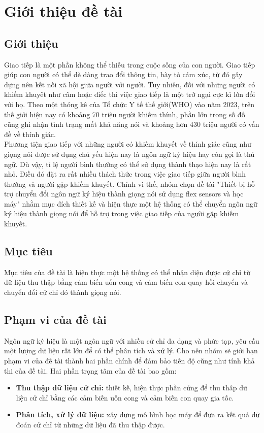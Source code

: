 \section{Giới thiệu đề tài}
\subsection{Giới thiệu}
\indent Giao tiếp là một phần không thể thiếu trong cuộc sống của con người. Giao tiếp giúp con người có thể dẽ dàng trao đổi thông tin, bày tỏ cảm xúc, từ đó gây dựng nên kết nối xã hội giữa người với người. Tuy nhiên, đối với những người có khiếm khuyêt như câm hoặc điếc thì việc giao tiếp là một trở ngại cực kì lớn đối với họ. Theo một thóng kê của Tổ chức Y tế thế giới(WHO) vào năm 2023, trên thế giới hiện nay có khoảng 70 triệu người khiếm thính, phần lớn trong số đố cũng ghi nhận tình trạng mất khả năng nói và khoảng hơn 430 triệu người có vấn đề về thính giác.\\
\indent Phương tiện giao tiếp với những người có khiếm khuyết về thính giác cũng như giọng nói được sử dụng chủ yếu hiện nay là ngôn ngữ ký hiệu hay còn gọi là thủ ngữ. Dù vậy, tỉ lệ người bình thường có thể sử dụng thành thạo hiện nay là rất nhỏ. Điều đó đặt ra rất nhiều thách thức trong việc giao tiếp giữa người bình thường và người gặp khiếm khuyết. Chính vì thế, nhóm chọn đề tài "Thiết bị hỗ trợ chuyển đổi ngôn ngữ ký hiệu thành giọng nói sử dụng flex sensors và học máy" nhằm mục đích thiết kế và hiện thực một hệ thống có thể chuyển ngôn ngữ ký hiệu thành giọng nói để hỗ trợ trong việc giao tiếp của người gặp khiếm khuyết.
\subsection{Mục tiêu}
\indent Mục tiêu của đề tài là hiện thực một hệ thống có thể nhận diện được cử chỉ từ dữ liệu thu thập bằng cảm biến uốn cong và cảm biến con quay hồi chuyển và chuyển đổi cử chỉ đó thành giọng nói.
\subsection{Phạm vi của đề tài}
\indent Ngôn ngữ ký hiệu là một ngôn ngữ với nhiều cử chỉ đa dạng và phức tạp, yêu cầu một lượng dữ liệu rất lớn để có thể phân tích và xử lý. Cho nên nhóm sẽ giới hạn phạm vi của đề tài thành hai phần chính để đảm bảo tiến độ cũng như tính khả thi của đề tài. Hai phần trọng tâm của đề tài bao gồm:
\begin{itemize}
    \item \textbf{Thu thập dữ liệu cử chỉ:} thiết  kế, hiện thực phần cứng để thu thâp dữ liệu cử chỉ bằng  các cảm biến uốn cong và cảm biến con quay gia tốc.
    \item \textbf{Phân tích, xử lý dữ liệu:} xây dưng mô hình học máy để đưa ra kết quả dữ đoán cử chỉ từ những dữ liệu đã thu thập được.
\end{itemize}


